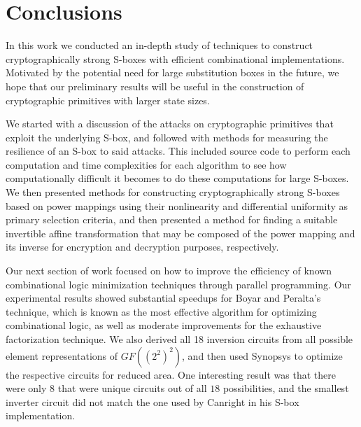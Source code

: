 \section{Conclusions}
In this work we conducted an in-depth study of techniques to construct cryptographically strong S-boxes with efficient combinational implementations. Motivated by the potential need for large substitution boxes in the future, we hope that our preliminary results will be useful in the construction of cryptographic primitives with larger state sizes. 

We started with a discussion of the attacks on cryptographic primitives that exploit the underlying S-box, and followed with methods for measuring the resilience of an S-box to said attacks. This included source code to perform each computation and time complexities for each algorithm to see how computationally difficult it becomes to do these computations for large S-boxes. We then presented methods for constructing cryptographically strong S-boxes based on power mappings using their nonlinearity and differential uniformity as primary selection criteria, and then presented a method for finding a suitable invertible affine transformation that may be composed of the power mapping and its inverse for encryption and decryption purposes, respectively. 

Our next section of work focused on how to improve the efficiency of known combinational logic minimization techniques through parallel programming. Our experimental results showed substantial speedups for Boyar and Peralta's technique, which is known as the most effective algorithm for optimizing combinational logic, as well as moderate improvements for the exhaustive factorization technique. We also derived all 18 inversion circuits from all possible element representations of $GF((2^2)^2)$, and then used Synopsys to optimize the respective circuits for reduced area. One interesting result was that there were only $8$ that were unique circuits out of all $18$ possibilities, and the smallest inverter circuit did not match the one used by Canright in his S-box implementation.

